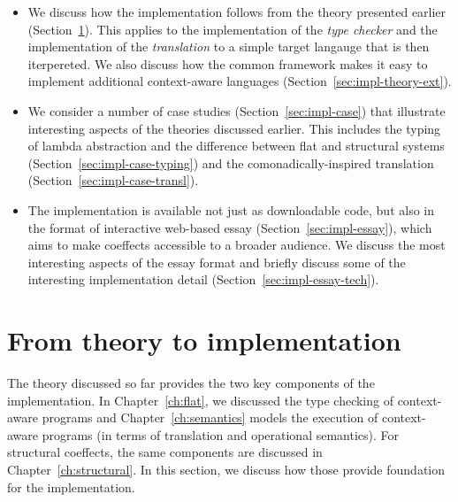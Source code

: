 \begin{itemize}
\item We discuss how the implementation follows from the theory presented earlier (Section~\ref{sec:impl-theory}).
  This applies to the implementation of the \emph{type checker} and the implementation of the \emph{translation}
  to a simple target langauge that is then iterpereted. We also discuss how the common framework makes it
  easy to implement additional context-aware languages (Section~\ref{sec:impl-theory-ext}).

\item We consider a number of case studies (Section~\ref{sec:impl-case}) that illustrate interesting
  aspects of the theories discussed earlier. This includes the typing of lambda abstraction and the
  difference between flat and structural systems (Section~\ref{sec:impl-case-typing}) and the
  comonadically-inspired translation (Section~\ref{sec:impl-case-transl}).

\item The implementation is available not just as downloadable code, but also in the format of
  interactive web-based essay (Section~\ref{sec:impl-essay}), which aims to make coeffects
  accessible to a broader audience. We discuss the most interesting aspects of the essay format and
  briefly discuss some of the interesting implementation detail (Section~\ref{sec:impl-essay-tech}).
\end{itemize}


%
%

\section{From theory to implementation}
\label{sec:impl-theory}

The theory discussed so far provides the two key components of the implementation. In
Chapter~\ref{ch:flat}, we discussed the type checking of context-aware programs and
Chapter~\ref{ch:semantics} models the execution of context-aware programs (in terms of
translation and operational semantics). For structural coeffects, the same components are discussed
in Chapter~\ref{ch:structural}. In this section, we discuss how those provide foundation for the
implementation.

